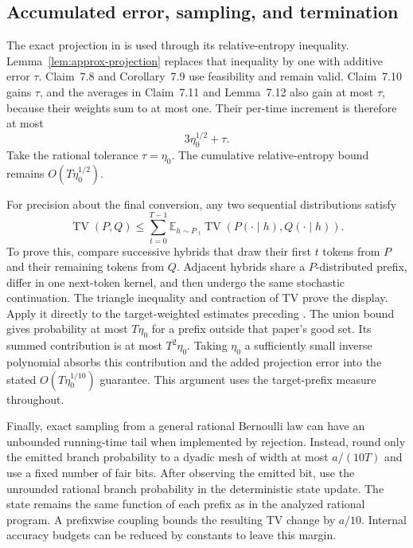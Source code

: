 \documentclass[11pt]{article}
\newcommand{\TV}{\operatorname{TV}}
\theoremstyle{definition}
\theoremstyle{remark}
\begin{document}
\subsection{Accumulated error, sampling, and termination}

The exact projection in \citet[Claim~7.7]{liu-moitra} is used through its relative-entropy inequality. Lemma~\ref{lem:approx-projection} replaces that inequality by one with additive error $\tau$. Claim~7.8 and Corollary~7.9 use feasibility and remain valid. Claim~7.10 gains $\tau$, and the averages in Claim~7.11 and Lemma~7.12 also gain at most $\tau$, because their weights sum to at most one. Their per-time increment is therefore at most
\[
3\eta_0^{1/2}+\tau.
\]
Take the rational tolerance $\tau=\eta_0$. The cumulative relative-entropy bound remains $O(T\eta_0^{1/2})$.

For precision about the final conversion, any two sequential distributions satisfy
\begin{equation}\label{eq:target-telescope}
\TV(P,Q)\le\sum_{t=0}^{T-1}
\mathbb E_{h\sim P_{:t}}
\TV(P(\cdot\mid h),Q(\cdot\mid h)).
\end{equation}
To prove this, compare successive hybrids that draw their first $t$ tokens from $P$ and their remaining tokens from $Q$. Adjacent hybrids share a $P$-distributed prefix, differ in one next-token kernel, and then undergo the same stochastic continuation. The triangle inequality and contraction of TV prove the display. Apply it directly to the target-weighted estimates preceding \citet[Lemma~7.13]{liu-moitra}. The union bound gives probability at most $T\eta_0$ for a prefix outside that paper's good set. Its summed contribution is at most $T^2\eta_0$. Taking $\eta_0$ a sufficiently small inverse polynomial absorbs this contribution and the added projection error into the stated $O(T\eta_0^{1/10})$ guarantee. This argument uses the target-prefix measure throughout.

Finally, exact sampling from a general rational Bernoulli law can have an unbounded running-time tail when implemented by rejection. Instead, round only the emitted branch probability to a dyadic mesh of width at most $a/(10T)$ and use a fixed number of fair bits. After observing the emitted bit, use the unrounded rational branch probability in the deterministic state update. The state remains the same function of each prefix as in the analyzed rational program. A prefixwise coupling bounds the resulting TV change by $a/10$. Internal accuracy budgets can be reduced by constants to leave this margin.
\end{document}

